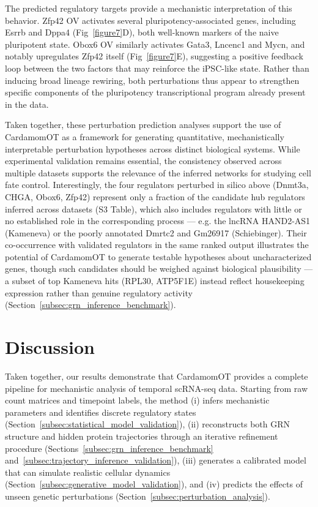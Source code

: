 \documentclass[a4paper, 11pt]{article}
\theoremstyle{plain}
\theoremstyle{remark}
\newcommand*{\firstreview}[1]{{\color{black}#1}}
\begin{document}
The predicted regulatory targets provide a mechanistic interpretation of this 
behavior. {Zfp42} OV activates several pluripotency-associated genes, 
including {Esrrb} and {Dppa4} (Fig~\ref{figure7}D), both well-known 
markers of the naive pluripotent state. {Obox6} OV similarly activates 
{Gata3}, {Lncenc1} and {Mycn}, and notably upregulates {Zfp42} 
itself (Fig~\ref{figure7}E), suggesting a positive feedback loop between the 
two factors that may reinforce the iPSC-like state. Rather than inducing broad 
lineage rewiring, both perturbations thus appear to strengthen specific components 
of the pluripotency transcriptional program already present in the data.

Taken together, these perturbation \firstreview{prediction} analyses support the use of CardamomOT as a framework for generating quantitative, mechanistically interpretable perturbation hypotheses across distinct biological systems. While experimental validation remains essential, the consistency observed across multiple datasets supports the relevance of the inferred networks for studying cell fate control.
\firstreview{Interestingly, the four regulators perturbed in silico above (Dnmt3a, CHGA, Obox6, Zfp42) represent only a fraction of the candidate hub regulators inferred across datasets (S3 Table), which also includes regulators with little or no established role in the corresponding process — e.g. the lncRNA HAND2-AS1 (Kameneva) or the poorly annotated Dmrtc2 and Gm26917 (Schiebinger). Their co-occurrence with validated regulators in the same ranked output illustrates the potential of CardamomOT to generate testable hypotheses about uncharacterized genes, though such candidates should be weighed against biological plausibility — a subset of top Kameneva hits (RPL30, ATP5F1E) instead reflect housekeeping expression rather than genuine regulatory activity (Section~\ref{subsec:grn_inference_benchmark}).}


\section{Discussion}
\label{discussion}

Taken together, our results demonstrate that CardamomOT provides a complete pipeline for mechanistic analysis of temporal scRNA-seq data. Starting from raw count matrices and timepoint labels, the method (i) infers mechanistic parameters and identifies discrete regulatory states (Section~\ref{subsec:statistical_model_validation}), (ii) reconstructs both GRN structure and hidden protein trajectories through an iterative refinement procedure (Sections~\ref{subsec:grn_inference_benchmark} and~\ref{subsec:trajectory_inference_validation}), (iii) generates a calibrated model that can simulate realistic cellular dynamics (Section~\ref{subsec:generative_model_validation}), and (iv) predicts the effects of unseen genetic perturbations (Section~\ref{subsec:perturbation_analysis}).
\end{document}
